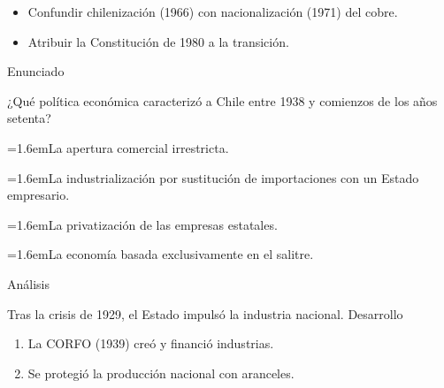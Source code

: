 \documentclass[10pt,a4paper,twocolumn]{article}
\newcommand{\alternativa}[2]{\par\noindent\hangindent=1.6em\hangafter=1\makebox[1.6em][l]{\tecla{#1}}#2\par}
\newcommand{\clave}[1]{\par\smallskip{\sffamily\footnotesize\color{esmeralda} Clave \teclaok{#1}}\par}
\begin{document}
\begin{errorfrecuente}
\begin{itemize}
  \item Confundir chilenización (1966) con nacionalización (1971) del cobre.
  \item Atribuir la Constitución de 1980 a la transición.
\end{itemize}
\end{errorfrecuente}

\begin{ejemplo}
{\sffamily\footnotesize\color{zinc500} Enunciado}\par
¿Qué política económica caracterizó a Chile entre 1938 y comienzos de los años setenta?
\alternativa{A}{La apertura comercial irrestricta.}
\alternativa{B}{La industrialización por sustitución de importaciones con un Estado empresario.}
\alternativa{C}{La privatización de las empresas estatales.}
\alternativa{D}{La economía basada exclusivamente en el salitre.}
\clave{B}
{\sffamily\footnotesize\color{zinc500} Análisis}\par Tras la crisis de 1929, el Estado impulsó la industria nacional.
{\sffamily\footnotesize\color{zinc500} Desarrollo}
\begin{enumerate}
  \item La CORFO (1939) creó y financió industrias.
  \item Se protegió la producción nacional con aranceles.
\end{enumerate}
\end{ejemplo}
\end{document}
